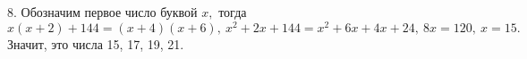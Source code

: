 8. Обозначим первое число буквой $x,$ тогда $x(x+2)+144=(x+4)(x+6),\ x^2+2x+144=x^2+6x+4x+24,\ 8x=120,\ x=15.$ Значит, это числа 15, 17, 19, 21.\\
